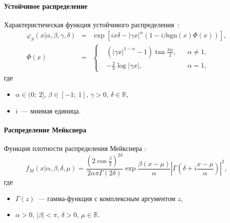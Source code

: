 \documentclass[aspectratio=169]{beamer}
\begin{document}
\begin{frame}{\insertsection}
    \framesubtitle{Устойчивое распределение}
    Характеристическая функция устойчивого распределения~\cite{Nolan2009}:
    \begin{eqnarray}
        \varphi_S(x|\alpha,\beta,\gamma,\delta) &=& \exp{\left[ix\delta-|\gamma x|^\alpha \left(1 - i\beta\text{sgn}(x)\Phi(x)\right)\right]}, \\
        \Phi(x) &=& \left\{ \begin{aligned}
            & \left(|\gamma x|^{1-\alpha} - 1\right)\tan{\frac{\pi\alpha}{2}}, & & \alpha \ne 1, \\
            & -\frac{2}{\pi}\log{|\gamma x|}, & & \alpha = 1,
        \end{aligned} \right. \nonumber
    \end{eqnarray}
    где
    \begin{itemize}
        \item $\alpha \in (0;\ 2]$, $\beta \in [-1;\ 1]$, $\gamma > 0$, $\delta \in \mathbb{R}$, 
        \item $i$~--- мнимая единица.
    \end{itemize}
\end{frame}

\begin{frame}{\insertsection}
    \framesubtitle{Распределение Мейкснера}
    Функция плотности распределения Мейкснера \cite{Schoutens2002}:
    \begin{equation}
        f_M(x|\alpha,\beta,\delta,\mu) = \frac{ \left( 2 \cos{ \frac{\beta}{2}} \right)^{2 \delta}}{2 \alpha \pi \Gamma(2 \delta)} \exp{\frac{\beta(x - \mu)}{\alpha}} \left| \Gamma \left( \delta + i \frac{x - \mu}{\alpha} \right) \right|^2,
    \end{equation}
    где
    \begin{itemize}
        \item $\Gamma(z)$~--- гамма-функция с комплексным аргументом $z$, 
        \item $\alpha > 0$, $|\beta| < \pi$, $\delta > 0$, $\mu \in \mathbb{R}$.
    \end{itemize}
\end{frame}
\end{document}
